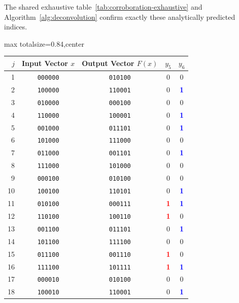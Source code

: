 \documentclass[11pt]{article}
\theoremstyle{definition}
\begin{document}
\normalsize

The shared exhaustive table~\ref{tab:corroboration-exhaustive} and Algorithm~\ref{alg:deconvolution} confirm exactly these analytically predicted indices.

\begin{table}[p]
\centering
\setlength{\tabcolsep}{2pt}
\renewcommand{\arraystretch}{0.83}
\tiny
\begin{adjustbox}{max totalsize={\textwidth}{0.84\textheight},center}
\begin{tabular}{@{}rcccc@{}}
\toprule
\(j\) & Input Vector \(x\) & Output Vector \(F(x)\) & \(y_5\) & \(y_6\)\\
\midrule
1 & \texttt{000000} & \texttt{010100} & 0 & 0 \\
2 & \texttt{100000} & \texttt{110001} & 0 & \textbf{\textcolor{blue}{1}} \\
3 & \texttt{010000} & \texttt{000100} & 0 & 0 \\
4 & \texttt{110000} & \texttt{100001} & 0 & \textbf{\textcolor{blue}{1}} \\
5 & \texttt{001000} & \texttt{011101} & 0 & \textbf{\textcolor{blue}{1}} \\
6 & \texttt{101000} & \texttt{111000} & 0 & 0 \\
7 & \texttt{011000} & \texttt{001101} & 0 & \textbf{\textcolor{blue}{1}} \\
8 & \texttt{111000} & \texttt{101000} & 0 & 0 \\
9 & \texttt{000100} & \texttt{010100} & 0 & 0 \\
10 & \texttt{100100} & \texttt{110101} & 0 & \textbf{\textcolor{blue}{1}} \\
11 & \texttt{010100} & \texttt{000111} & \textbf{\textcolor{red}{1}} & \textbf{\textcolor{blue}{1}} \\
12 & \texttt{110100} & \texttt{100110} & \textbf{\textcolor{red}{1}} & 0 \\
13 & \texttt{001100} & \texttt{011101} & 0 & \textbf{\textcolor{blue}{1}} \\
14 & \texttt{101100} & \texttt{111100} & 0 & 0 \\
15 & \texttt{011100} & \texttt{001110} & \textbf{\textcolor{red}{1}} & 0 \\
16 & \texttt{111100} & \texttt{101111} & \textbf{\textcolor{red}{1}} & \textbf{\textcolor{blue}{1}} \\
17 & \texttt{000010} & \texttt{010100} & 0 & 0 \\
18 & \texttt{100010} & \texttt{110001} & 0 & \textbf{\textcolor{blue}{1}} \\

\end{tabular}
\end{adjustbox}
\end{table}
\end{document}
